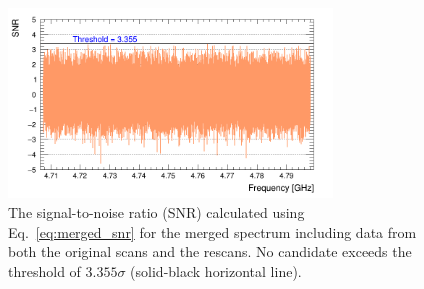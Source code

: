 
\begin{figure}[hbt!]
    \centering
    \includegraphics[width=8.6cm]{figures/SNR_GrandSpectrum_AxionRun_AllSteps_Rescan_Merged_5bin_SG4_W201_LqWeight.png}
    \caption{The signal-to-noise ratio (SNR) calculated using Eq.~\eqref{eq:merged_snr} for the merged spectrum including data from both the original 
scans and the rescans. No candidate exceeds the threshold of 
$3.355\sigma$ (solid-black horizontal line). }
    \label{fig:SNR_merged}
\end{figure}
